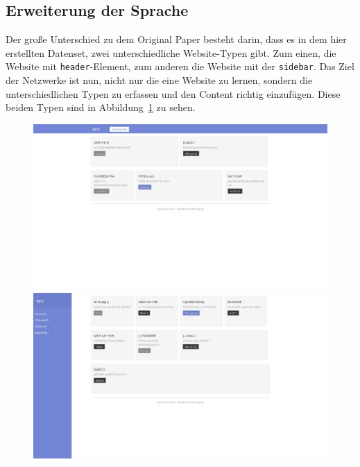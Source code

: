 \documentclass[pdftex,a4paper,halfparskip, article]{scrartcl}
\begin{document}
\subsection{Erweiterung der Sprache}

Der große Unterschied zu dem Original Paper besteht darin, dass es in dem hier erstellten Datenset, zwei unterschiedliche Website-Typen gibt. Zum einen, die Website mit \texttt{header}-Element, zum anderen die Website mit der \texttt{sidebar}. Das Ziel der Netzwerke ist nun, nicht nur die eine Website zu lernen, sondern die unterschiedlichen Typen zu erfassen und den Content richtig einzufügen. Diese beiden Typen sind in Abbildung~\ref{fig:vergleich_daten} zu sehen.

\begin{figure}
\centering
\begin{minipage}{.5\textwidth}
  \centering
  \includegraphics[width=.9\linewidth]{beispiel_daten_2}
\end{minipage}%
\begin{minipage}{.5\textwidth}
  \centering
  \includegraphics[width=.9\linewidth]{beispiel_daten_3}
  \end{minipage}
  \label{fig:vergleich_daten}
\end{figure}
\end{document}
